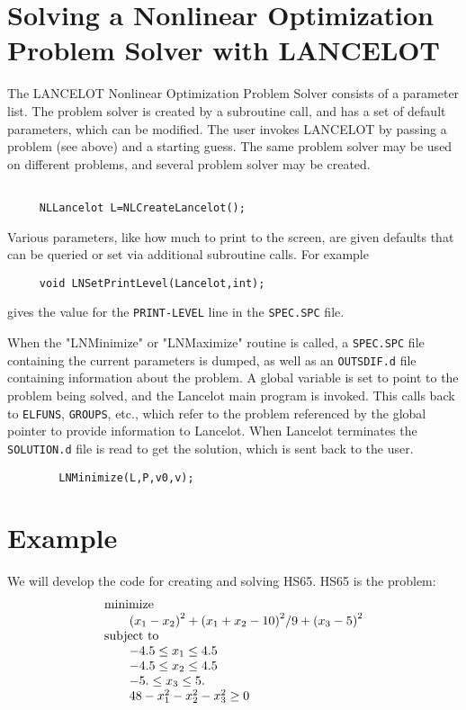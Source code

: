 \documentclass[12pt]{article}
\begin{document}
   \section{Solving a Nonlinear Optimization Problem Solver with LANCELOT}

    The LANCELOT Nonlinear Optimization Problem Solver consists of a 
    parameter list. The problem solver is created by a subroutine call,
    and has a set of default parameters, which can be modified. The
    user invokes LANCELOT by passing a problem (see above) and a 
    starting guess. The same problem solver may be used on different
    problems, and several problem solver may be created. 
    \begin{verbatim}

     NLLancelot L=NLCreateLancelot();
    \end{verbatim}
    Various parameters, like how much to print to the screen, are given
    defaults that can be queried or set via additional subroutine calls.
    For example
    \begin{verbatim}
     void LNSetPrintLevel(Lancelot,int);
    \end{verbatim}
    gives the value for the {\tt PRINT-LEVEL} line in the {\tt SPEC.SPC} 
    file.
   
    When the "LNMinimize" or "LNMaximize" routine is called, a {\tt SPEC.SPC}
    file containing the current parameters is dumped, as well as an 
    {\tt OUTSDIF.d} file containing information about the problem. A global
    variable is set to point to the problem being solved, and the Lancelot
    main program is invoked. This calls back to {\tt ELFUNS}, {\tt GROUPS},
    etc., which refer to the problem referenced by the global pointer
    to provide information to Lancelot.  When Lancelot terminates the 
    {\tt SOLUTION.d} file is read to get the solution, which is sent back 
    to the user.
    \begin{verbatim}
        LNMinimize(L,P,v0,v);
    \end{verbatim}

\section{Example}

  We will develop the code for creating and solving HS65. HS65 is the problem:
  \begin{displaymath}
  \begin{array}{l}
    {\rm minimize}\\
    \qquad {(x_1-x_2)}^2 + {(x_1+x_2-10)}^2/9 +{(x_3-5)}^2\\
    {\rm subject~to}\\
    \qquad -4.5 \leq x_1 \leq 4.5\\
    \qquad -4.5 \leq x_2 \leq 4.5\\
    \qquad -5. \leq x_3 \leq 5.\\
    \qquad 48-x_1^2 -x_2^2 -x_3^2\geq 0\\
   \end{array}
  \end{displaymath}
\end{document}

